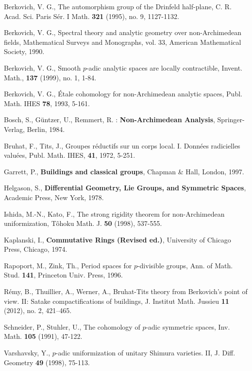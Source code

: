 \documentclass{amsart}
\theoremstyle{theorem}
\theoremstyle{lemma}
\theoremstyle{prop}
\theoremstyle{definition}
\theoremstyle{corollary}
\theoremstyle{remark}
\begin{document}
\begin{thebibliography}{1}
Berkovich, V. G., The automorphism group of the Drinfeld half-plane, C. R. Acad. Sci. Paris S\'er. I Math. {\bf 321} (1995), no. 9, 1127-1132.

 Berkovich, V. G., Spectral theory and analytic geometry over non-Archimedean fields, Mathematical Surveys and Monographs, vol. 33, American Mathematical Society, 1990.

 Berkovich, V. G., Smooth $p$-adic analytic spaces are locally contractible, Invent. Math., {\bf 137} (1999), no. 1, 1-84.

 Berkovich, V. G., \'Etale cohomology for non-Archimedean analytic spaces, Publ. Math. IHES {\bf 78}, 1993, 5-161.

 Bosch, S., G\"untzer, U., Remmert, R. : {\bf Non-Archimedean Analysis}, Springer-Verlag, Berlin, 1984.

Bruhat, F., Tits, J., Groupes r\'eductifs sur un corps local. I. Donn\'ees radicielles valu\'ees, Publ. Math. IHES, {\bf 41}, 1972, 5-251. 


Garrett, P., {\bf Buildings and classical groups}, Chapman \& Hall, London, 1997. 

 Helgason, S., {\bf Differential Geometry, Lie Groups, and Symmetric Spaces}, Academic Press, New York, 1978.

 Ishida, M.-N., Kato, F., The strong rigidity theorem for non-Archimedean uniformization, T\^ohoku Math. J. {\bf 50} (1998), 537-555.

 Kaplanski, I., {\bf Commutative Rings (Revised ed.)}, University of Chicago Press, Chicago, 1974.

 Rapoport, M., Zink, Th., Period spaces for $p$-divisible groups, Ann. of Math. Stud. {\bf 141}, Princeton Univ. Press, 1996.

 R\'emy, B., Thuillier, A., Werner, A.,  Bruhat-Tits theory from Berkovich's point of view. II: Satake compactifications of buildings, J. Institut Math. Jussieu {\bf 11} (2012), no. 2, 421–465.

 Schneider, P., Stuhler, U., The cohomology of $p$-adic symmetric spaces, Inv. Math. {\bf 105} (1991), 47-122.

 Varshavsky, Y., $p$-adic uniformization of unitary Shimura varieties. II, J. Diff. Geometry {\bf 49} (1998), 75-113.
\end{thebibliography}
\end{document}
